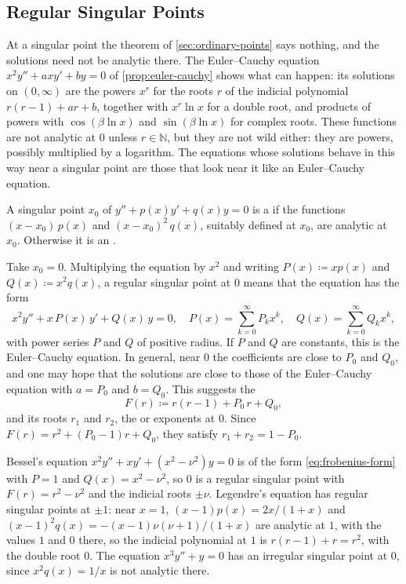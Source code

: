 \subsection{Regular Singular Points}

At a singular point the theorem of \cref{sec:ordinary-points} says nothing, and the solutions need not be analytic there. The Euler--Cauchy equation $x^2y''+axy'+by=0$ of \cref{prop:euler-cauchy} shows what can happen: its solutions on $(0,\infty)$ are the powers $x^r$ for the roots $r$ of the indicial polynomial $r(r-1)+ar+b$, together with $x^r\ln x$ for a double root, and products of powers with $\cos(\beta\ln x)$ and $\sin(\beta\ln x)$ for complex roots. These functions are not analytic at $0$ unless $r\in\mathbb N$, but they are not wild either: they are powers, possibly multiplied by a logarithm. The equations whose solutions behave in this way near a singular point are those that look near it like an Euler--Cauchy equation.

\begin{definition}
\label{def:regular-singular}
A singular point $x_0$ of $y''+p(x)y'+q(x)y=0$ is a  if the functions $(x-x_0)\,p(x)$ and $(x-x_0)^2\,q(x)$, suitably defined at $x_0$, are analytic at $x_0$. Otherwise it is an .
\end{definition}

Take $x_0=0$. Multiplying the equation by $x^2$ and writing $P(x)\coloneqq xp(x)$ and $Q(x)\coloneqq x^2q(x)$, a regular singular point at $0$ means that the equation has the form
\begin{equation}
x^2y''+x\,P(x)\,y'+Q(x)\,y=0,\quad P(x)=\sum_{k=0}^\infty P_kx^k,\quad Q(x)=\sum_{k=0}^\infty Q_kx^k ,
\label{eq:frobenius-form}
\end{equation}
with power series $P$ and $Q$ of positive radius. If $P$ and $Q$ are constants, this is the Euler--Cauchy equation. In general, near $0$ the coefficients are close to $P_0$ and $Q_0$, and one may hope that the solutions are close to those of the Euler--Cauchy equation with $a=P_0$ and $b=Q_0$. This suggests the 
\begin{equation}
F(r)\coloneqq r(r-1)+P_0\,r+Q_0 ,
\label{eq:indicial}
\end{equation}
and its roots $r_1$ and $r_2$, the  or exponents at $0$. Since $F(r)=r^2+(P_0-1)r+Q_0$, they satisfy $r_1+r_2=1-P_0$.

Bessel's equation $x^2y''+xy'+(x^2-\nu^2)y=0$ is of the form \eqref{eq:frobenius-form} with $P=1$ and $Q(x)=x^2-\nu^2$, so $0$ is a regular singular point with $F(r)=r^2-\nu^2$ and the indicial roots $\pm\nu$. Legendre's equation has regular singular points at $\pm1$: near $x=1$, $(x-1)p(x)=2x/(1+x)$ and $(x-1)^2q(x)=-(x-1)\nu(\nu+1)/(1+x)$ are analytic at $1$, with the values $1$ and $0$ there, so the indicial polynomial at $1$ is $r(r-1)+r=r^2$, with the double root $0$. The equation $x^3y''+y=0$ has an irregular singular point at $0$, since $x^2q(x)=1/x$ is not analytic there.

